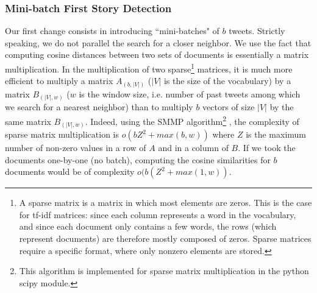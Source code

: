 \subsubsection{Mini-batch First Story Detection}
\label{Subsec: FSD}
 Our first change consists in introducing ``mini-batches" of $b$ tweets. Strictly speaking, we do not parallel the search for a closer neighbor. We use the fact that 
computing cosine distances between two sets of documents is essentially a matrix multiplication. In the multiplication of two sparse\footnote{A sparse matrix is a matrix in which most elements are zeros. This is the case for tf-idf matrices: since each column represents a word in the vocabulary, and since each document only contains a few words, the rows (which represent documents) are therefore mostly composed of zeros. Sparse matrices require a specific format, where only nonzero elements are stored.} matrices, it is much more efficient to multiply a matrix $A_{(b,|V|)}$ ($|V|$ is the size of the vocabulary) by a matrix $B_{(|V|,w)}$ ($w$ is the window size, i.e. number of past tweets among which we search for a nearest neighbor) than to multiply $b$ vectors of size $|V|$ by the same matrix $B_{(|V|,w)}$. Indeed, using the SMMP algorithm\footnote{This algorithm is implemented for sparse matrix multiplication in the python scipy module.} \citep{banks_sparse_1993}, the complexity of sparse matrix multiplication is $o(bZ^2 + max(b,w))$  where $Z$ is the maximum number of non-zero values in a row of $A$ and in a column of $B$. If we took the documents one-by-one (no batch), computing the cosine similarities for $b$ documents would be of complexity $o(b(Z
^2 + max(1, w))$.
 
